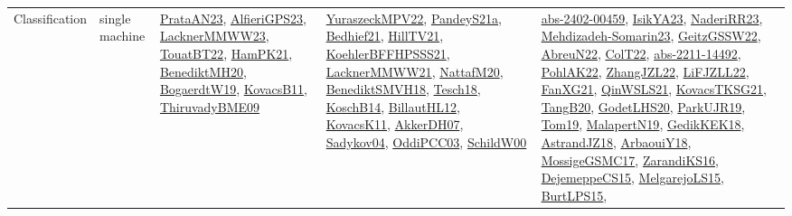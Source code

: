 {\begin{longtable}{lp{3cm}>{\raggedright}p{6cm}>{\raggedright}p{6cm}p{8cm}}
Classification & single machine & \href{articles/PrataAN23.pdf}{PrataAN23}\cite{PrataAN23}, \href{articles/AlfieriGPS23.pdf}{AlfieriGPS23}\cite{AlfieriGPS23}, \href{articles/LacknerMMWW23.pdf}{LacknerMMWW23}\cite{LacknerMMWW23}, \href{papers/TouatBT22.pdf}{TouatBT22}\cite{TouatBT22}, \href{articles/HamPK21.pdf}{HamPK21}\cite{HamPK21}, \href{articles/BenediktMH20.pdf}{BenediktMH20}\cite{BenediktMH20}, \href{papers/BogaerdtW19.pdf}{BogaerdtW19}\cite{BogaerdtW19}, \href{articles/KovacsB11.pdf}{KovacsB11}\cite{KovacsB11}, \href{papers/ThiruvadyBME09.pdf}{ThiruvadyBME09}\cite{ThiruvadyBME09} & \href{articles/YuraszeckMPV22.pdf}{YuraszeckMPV22}\cite{YuraszeckMPV22}, \href{articles/PandeyS21a.pdf}{PandeyS21a}\cite{PandeyS21a}, \href{articles/Bedhief21.pdf}{Bedhief21}\cite{Bedhief21}, \href{papers/HillTV21.pdf}{HillTV21}\cite{HillTV21}, \href{articles/KoehlerBFFHPSSS21.pdf}{KoehlerBFFHPSSS21}\cite{KoehlerBFFHPSSS21}, \href{papers/LacknerMMWW21.pdf}{LacknerMMWW21}\cite{LacknerMMWW21}, \href{papers/NattafM20.pdf}{NattafM20}\cite{NattafM20}, \href{papers/BenediktSMVH18.pdf}{BenediktSMVH18}\cite{BenediktSMVH18}, \href{papers/Tesch18.pdf}{Tesch18}\cite{Tesch18}, \href{papers/KoschB14.pdf}{KoschB14}\cite{KoschB14}, \href{papers/BillautHL12.pdf}{BillautHL12}\cite{BillautHL12}, \href{articles/KovacsK11.pdf}{KovacsK11}\cite{KovacsK11}, \href{papers/AkkerDH07.pdf}{AkkerDH07}\cite{AkkerDH07}, \href{papers/Sadykov04.pdf}{Sadykov04}\cite{Sadykov04}, \href{papers/OddiPCC03.pdf}{OddiPCC03}\cite{OddiPCC03}, \href{articles/SchildW00.pdf}{SchildW00}\cite{SchildW00} & \href{articles/abs-2402-00459.pdf}{abs-2402-00459}\cite{abs-2402-00459}, \href{articles/IsikYA23.pdf}{IsikYA23}\cite{IsikYA23}, \href{articles/NaderiRR23.pdf}{NaderiRR23}\cite{NaderiRR23}, \href{papers/Mehdizadeh-Somarin23.pdf}{Mehdizadeh-Somarin23}\cite{Mehdizadeh-Somarin23}, \href{papers/GeitzGSSW22.pdf}{GeitzGSSW22}\cite{GeitzGSSW22}, \href{articles/AbreuN22.pdf}{AbreuN22}\cite{AbreuN22}, \href{articles/ColT22.pdf}{ColT22}\cite{ColT22}, \href{articles/abs-2211-14492.pdf}{abs-2211-14492}\cite{abs-2211-14492}, \href{articles/PohlAK22.pdf}{PohlAK22}\cite{PohlAK22}, \href{papers/ZhangJZL22.pdf}{ZhangJZL22}\cite{ZhangJZL22}, \href{papers/LiFJZLL22.pdf}{LiFJZLL22}\cite{LiFJZLL22}, \href{articles/FanXG21.pdf}{FanXG21}\cite{FanXG21}, \href{articles/QinWSLS21.pdf}{QinWSLS21}\cite{QinWSLS21}, \href{papers/KovacsTKSG21.pdf}{KovacsTKSG21}\cite{KovacsTKSG21}, \href{papers/TangB20.pdf}{TangB20}\cite{TangB20}, \href{papers/GodetLHS20.pdf}{GodetLHS20}\cite{GodetLHS20}, \href{papers/ParkUJR19.pdf}{ParkUJR19}\cite{ParkUJR19}, \href{papers/Tom19.pdf}{Tom19}\cite{Tom19}, \href{papers/MalapertN19.pdf}{MalapertN19}\cite{MalapertN19}, \href{articles/GedikKEK18.pdf}{GedikKEK18}\cite{GedikKEK18}, \href{papers/AstrandJZ18.pdf}{AstrandJZ18}\cite{AstrandJZ18}, \href{papers/ArbaouiY18.pdf}{ArbaouiY18}\cite{ArbaouiY18}, \href{papers/MossigeGSMC17.pdf}{MossigeGSMC17}\cite{MossigeGSMC17}, \href{articles/ZarandiKS16.pdf}{ZarandiKS16}\cite{ZarandiKS16}, \href{papers/DejemeppeCS15.pdf}{DejemeppeCS15}\cite{DejemeppeCS15}, \href{papers/MelgarejoLS15.pdf}{MelgarejoLS15}\cite{MelgarejoLS15}, \href{papers/BurtLPS15.pdf}{BurtLPS15}\cite{BurtLPS15}, 
\end{longtable}}
